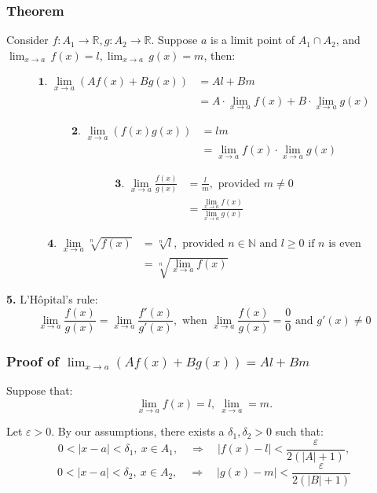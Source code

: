 \documentclass[11pt]{article}
\begin{document}
\subsubsection{Theorem}
\label{sec:org2a2f133}
Consider \(f : A_1 \rightarrow \mathbb{R}, g : A_2 \rightarrow \mathbb{R}\). Suppose \(a\) is a limit point of \(A_1 \cap A_2\), and \(\lim_{x \rightarrow a} \, f(x) = l, \lim_{x \rightarrow a} \, g(x) = m\), then:

\begin{align*}
\textbf{1. } \lim_{x \rightarrow a}(Af(x) + Bg(x)) &= Al + Bm \\
&= A \cdot \lim_{x \rightarrow a} f(x) + B \cdot \lim_{x \rightarrow a} g(x)
\end{align*}

\begin{align*}
\textbf{2. } \lim_{x \rightarrow a}(f(x) g(x)) &= lm \\
&= \lim_{x \rightarrow a} f(x) \cdot \lim_{x \rightarrow a} g(x)
\end{align*}

\begin{align*}
\textbf{3. } \lim_{x \rightarrow a} \frac{f(x)}{g(x)} &= \frac{l}{m},
\text{ provided } m \neq 0 \\
&= \frac{\lim_{x \rightarrow a} f(x)}{\lim_{x \rightarrow a} g(x)}
\end{align*}

\begin{align*}
\textbf{4. } \lim_{x \rightarrow a} \sqrt[n]{f(x)} &= \sqrt[n]{l},
\text{ provided } n \in \mathbb{N} \text{ and } l \ge 0 \text{ if } n \text{ is even} \\
&= \sqrt[n]{\lim_{x \rightarrow a} f(x)}
\end{align*}

\textbf{5.} L'H\(\text{\^o}\)pital's rule:
\[\lim_{x \rightarrow a} \frac{f(x)}{g(x)} = \lim_{x \rightarrow a} \frac{f'(x)}{g'(x)}, \text{ when } \lim_{x \rightarrow a} \frac{f(x)}{g(x)} = \frac{0}{0} \text{ and } g'(x) \neq 0\]

\newpage

\subsubsection{Proof of \(\lim_{x \rightarrow a}(Af(x) + Bg(x)) = Al + Bm\)}
\label{sec:org72fd453}

Suppose that:
\[\lim_{x \rightarrow a}f(x) = l, \ \lim_{x \rightarrow a} = m.\]

Let \(\varepsilon > 0\). By our assumptions, there exists a \(\delta_1, \delta_2 > 0\) such that:
\[0 < |x - a| < \delta_1, \ x \in A_1, \quad \Rightarrow \quad |f(x) - l| < \frac{\varepsilon}{2(|A| + 1)},\]
\[0 < |x - a| < \delta_2, \ x \in A_2, \quad \Rightarrow \quad |g(x) -m| < \frac{\varepsilon}{2(|B| + 1)}\]
\end{document}

